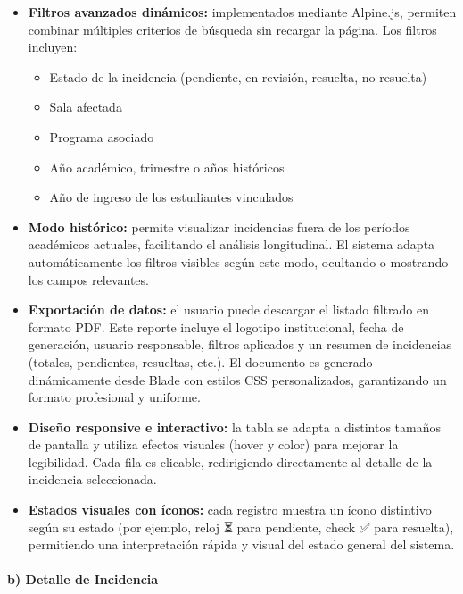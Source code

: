 \begin{itemize}
    \item \textbf{Filtros avanzados dinámicos:} implementados mediante Alpine.js, permiten combinar múltiples criterios de búsqueda sin recargar la página. Los filtros incluyen:
    \begin{itemize}
        \item Estado de la incidencia (pendiente, en revisión, resuelta, no resuelta)
        \item Sala afectada
        \item Programa asociado
        \item Año académico, trimestre o años históricos
        \item Año de ingreso de los estudiantes vinculados
    \end{itemize}
    
    \item \textbf{Modo histórico:} permite visualizar incidencias fuera de los períodos académicos actuales, facilitando el análisis longitudinal. El sistema adapta automáticamente los filtros visibles según este modo, ocultando o mostrando los campos relevantes.
    
    \item \textbf{Exportación de datos:} el usuario puede descargar el listado filtrado en formato PDF. Este reporte incluye el logotipo institucional, fecha de generación, usuario responsable, filtros aplicados y un resumen de incidencias (totales, pendientes, resueltas, etc.). El documento es generado dinámicamente desde Blade con estilos CSS personalizados, garantizando un formato profesional y uniforme.
    
    \item \textbf{Diseño responsive e interactivo:} la tabla se adapta a distintos tamaños de pantalla y utiliza efectos visuales (hover y color) para mejorar la legibilidad. Cada fila es clicable, redirigiendo directamente al detalle de la incidencia seleccionada.
    
    \item \textbf{Estados visuales con íconos:} cada registro muestra un ícono distintivo según su estado (por ejemplo, reloj ⏳ para pendiente, check ✅ para resuelta), permitiendo una interpretación rápida y visual del estado general del sistema.
\end{itemize}

\paragraph{b) Detalle de Incidencia}


